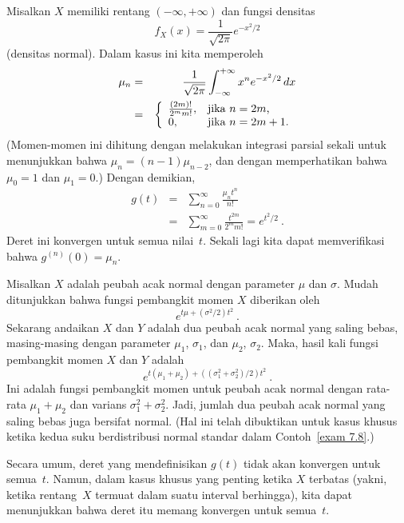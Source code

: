 \begin{example}\label{exam 10.3.3}
Misalkan $X$ memiliki rentang $(-\infty,+\infty)$ dan fungsi densitas
$$
f_X(x) = \frac1{\sqrt{2\pi}} e^{-x^2/2}
$$
(densitas normal).  Dalam kasus ini kita memperoleh
\begin{eqnarray*}
\mu_n &=& \frac1{\sqrt{2\pi}} \int_{-\infty}^{+\infty} x^n e^{-x^2/2}\, dx \\
      &=& \left \{ \begin{array}{ll}
                        \frac{(2m)!}{2^{m} m!}, & \mbox{jika $ n = 2m$,}\cr
                        0,                      & \mbox{jika $ n = 2m+1$.}\end{array}\right.
\end{eqnarray*}
(Momen-momen ini dihitung dengan melakukan integrasi parsial sekali untuk menunjukkan bahwa $\mu_n
= (n - 1)\mu_{n - 2}$, dan dengan memperhatikan bahwa $\mu_0 = 1$ dan $\mu_1 = 0$.)  Dengan demikian,
\begin{eqnarray*}
g(t) &=& \sum_{n = 0}^\infty \frac{\mu_n t^n}{n!} \\
     &=& \sum_{m = 0}^\infty \frac{t^{2m}}{2^{m} m!} = e^{t^2/2}\ .
\end{eqnarray*}
Deret ini konvergen untuk semua nilai~$t$.  Sekali lagi kita dapat memverifikasi bahwa
$g^{(n)}(0) = \mu_n$.
\par
Misalkan $X$ adalah peubah acak normal dengan parameter $\mu$ dan $\sigma$.  Mudah
ditunjukkan bahwa fungsi pembangkit momen $X$ diberikan oleh
$$e^{t\mu + (\sigma^2/2)t^2}\ .$$
Sekarang andaikan $X$ dan $Y$ adalah dua peubah acak normal yang saling bebas, masing-masing dengan
parameter $\mu_1$, $\sigma_1$, dan $\mu_2$, $\sigma_2$.  Maka,
hasil kali fungsi pembangkit momen $X$ dan $Y$ adalah
$$e^{t(\mu_1 + \mu_2) + ((\sigma_1^2 + \sigma_2^2)/2)t^2}\ .$$
Ini adalah fungsi pembangkit momen untuk peubah acak normal dengan rata-rata
$\mu_1 + \mu_2$ dan varians $\sigma_1^2 + \sigma_2^2$.  Jadi, jumlah
dua peubah acak normal yang saling bebas juga bersifat normal.  (Hal ini telah dibuktikan
untuk kasus khusus ketika kedua suku berdistribusi normal standar dalam Contoh~\ref{exam 
7.8}.)
\end{example}

Secara umum, deret yang mendefinisikan $g(t)$ tidak akan konvergen untuk semua~$t$.  Namun, dalam
kasus khusus yang penting ketika $X$ terbatas (yakni, ketika rentang~$X$
termuat dalam suatu interval berhingga), kita dapat menunjukkan bahwa deret itu memang konvergen
untuk semua~$t$.

